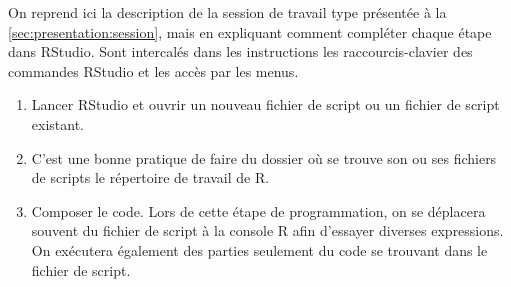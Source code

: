 On reprend ici la description de la session de travail type présentée
à la \autoref{sec:presentation:session}, mais en expliquant comment
compléter chaque étape dans RStudio. Sont intercalés dans les
instructions les raccourcis-clavier des commandes RStudio et les accès
par les menus.

\begin{enumerate}
\item Lancer RStudio et ouvrir un nouveau fichier de script ou un
  fichier de script existant.
\item C'est une bonne pratique de faire du dossier où se trouve son ou
  ses fichiers de scripts le répertoire de travail de R.
\item Composer le code. Lors de cette étape de programmation, on se
  déplacera souvent du fichier de script à la console R afin
  d'essayer diverses expressions. On exécutera également des parties
  seulement du code se trouvant dans le fichier de script.
\end{enumerate}
